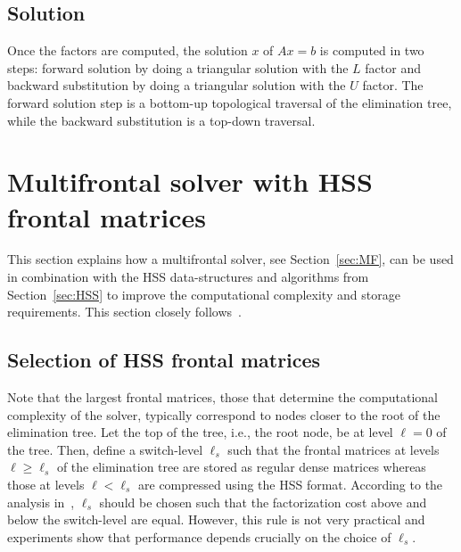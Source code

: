 \documentclass{article}
\newcommand{\ignore}[1]{}
\begin{document}
\ignore{ In the multifrontal factorization, the active memory, i.e., the memory
in use at a given step in the factorization, consists of the frontal
matrix being processed and a set of contribution blocks that are
temporarily stored and will be consumed at a later step.  The
multifrontal method lends itself very naturally to parallelism since
multiple processes can be employed to treat one, large enough, frontal
matrix or to process concurrently frontal matrices belonging to
separate subtrees.  These two sources of parallelism are commonly
referred to as node and tree parallelism, respectively, and their
correct exploitation is the key to achieving high performance on
parallel architectures.
}

\subsection{Solution}
Once the factors are computed, the solution $x$ of $Ax = b$ is
computed in two steps: forward solution by doing a triangular solution
with the $L$ factor and backward substitution by doing a triangular
solution with the $U$ factor. The forward solution step is a bottom-up
topological traversal of the elimination tree, while the backward
substitution is a top-down traversal.


\section{Multifrontal solver with HSS frontal matrices}\label{sec:MFHSS}
This section explains how a multifrontal solver, see
Section~\ref{sec:MF}, can be used in combination with the HSS
data-structures and algorithms from Section~\ref{sec:HSS} to improve
the computational complexity and storage requirements. This section
closely follows~\cite{xia2013randomized}.

\subsection{Selection of HSS frontal matrices}
Note that the largest frontal matrices, those that determine the
computational complexity of the solver, typically correspond to nodes
closer to the root of the elimination tree. Let the top of the tree,
i.e., the root node, be at level $\ell=0$ of the tree. Then, define a
switch-level $\ell_s$ such that the frontal matrices at levels $\ell
\geq \ell_s$ of the elimination tree are stored as regular dense
matrices whereas those at levels $\ell < \ell_s$ are compressed using
the HSS format. According to the analysis in~\cite{xia2013randomized},
$\ell_s$ should be chosen such that the factorization cost above and
below the switch-level are equal. However, this rule is not very
practical and experiments show that performance depends crucially on
the choice of $\ell_s$.
\end{document}
